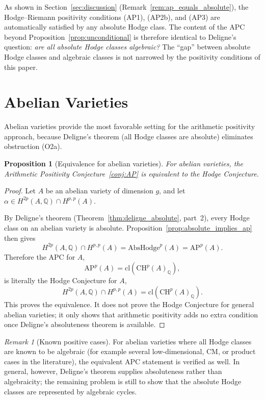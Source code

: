 \documentclass[aps,prd,twocolumn,superscriptaddress,nofootinbib]{revtex4-2}
\newtheorem{proposition}[theorem]{Proposition}
\theoremstyle{definition}
\theoremstyle{remark}
\newtheorem{remark}[theorem]{Remark}
\begin{document}
As shown in Section~\ref{sec:discussion} (Remark~\ref{rem:ap_equals_absolute}), the Hodge--Riemann positivity conditions (AP1), (AP2b), and (AP3) are automatically satisfied by any absolute Hodge class. The content of the APC beyond Proposition~\ref{prop:unconditional} is therefore identical to Deligne's question: \textit{are all absolute Hodge classes algebraic?} The ``gap'' between absolute Hodge classes and algebraic classes is not narrowed by the positivity conditions of this paper.


\section{Abelian Varieties}
\label{sec:abelian}

Abelian varieties provide the most favorable setting for the arithmetic positivity approach, because Deligne's theorem (all Hodge classes are absolute) eliminates obstruction (O2a).

\begin{proposition}[Equivalence for abelian varieties]
\label{thm:abelian}
For abelian varieties, the Arithmetic Positivity Conjecture~\ref{conj:AP} is equivalent to the Hodge Conjecture.
\end{proposition}

\begin{proof}
Let $A$ be an abelian variety of dimension $g$, and let $\alpha \in H^{2p}(A, \mathbb{Q}) \cap H^{p,p}(A)$.

By Deligne's theorem (Theorem~\ref{thm:deligne_absolute}, part~2), every Hodge class on an abelian variety is absolute. Proposition~\ref{prop:absolute_implies_ap} then gives
\[
H^{2p}(A,\mathbb{Q})\cap H^{p,p}(A)=\mathrm{AbsHodge}^p(A)=\mathrm{AP}^p(A).
\]
Therefore the APC for $A$,
\[
\mathrm{AP}^p(A)=\mathrm{cl}(\mathrm{CH}^p(A)_{\mathbb{Q}}),
\]
is literally the Hodge Conjecture for $A$,
\[
H^{2p}(A,\mathbb{Q})\cap H^{p,p}(A)
=\mathrm{cl}(\mathrm{CH}^p(A)_{\mathbb{Q}}).
\]
This proves the equivalence. It does not prove the Hodge Conjecture for general abelian varieties; it only shows that arithmetic positivity adds no extra condition once Deligne's absoluteness theorem is available.
\end{proof}

\begin{remark}[Known positive cases]
For abelian varieties where all Hodge classes are known to be algebraic (for example several low-dimensional, CM, or product cases in the literature), the equivalent APC statement is verified as well. In general, however, Deligne's theorem supplies absoluteness rather than algebraicity; the remaining problem is still to show that the absolute Hodge classes are represented by algebraic cycles.
\end{remark}
\end{document}
